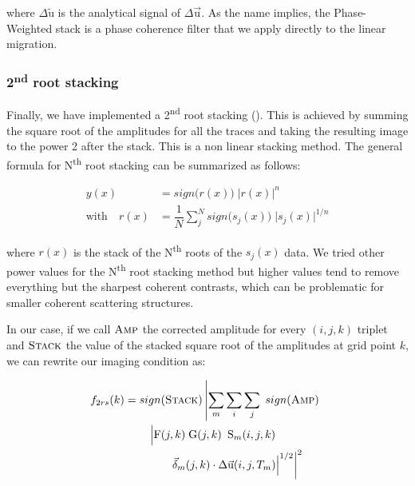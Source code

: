 \documentclass[10pt,a4paper]{article}
\numberwithin{equation}{section}
\DeclareRobustCommand{\rq}[1]{{\sethlcolor{myblue}\hl{#1}}}
\begin{document}
\noindent where $\Delta\tilde{\text{u}}$ is the analytical signal of $\Delta\vec{\text{u}}$.
As the name implies, the Phase-Weighted stack is a phase coherence filter that we apply directly to the linear migration.

\subsubsection{2\textsuperscript{nd} root stacking}

Finally, we have implemented a 2\textsuperscript{nd} root stacking (\cite{schi_gji_97}).
This is achieved by summing the square root of the amplitudes for all the traces and taking the resulting image to the power 2 after the stack.
This is a non linear stacking method.
The general formula for N\textsuperscript{th} root stacking can be summarized as follows:

\begin{align}
  y(x) &= sign\big(r(x)\big) \; \vert r(x) \vert^{n}
  \label{2nd_1}
\\
  \text{with} \quad r(x) &= \dfrac{1}{N} \sum_j^N sign\big(s_j(x)\big) \; \vert s_j(x) \vert^{1/n}
  \label{2nd_2}
\end{align}
\vspace{1mm}

\noindent where $r(x)$ is the stack of the N\textsuperscript{th} roots of the $s_j(x)$ data.
We tried other power values for the N\textsuperscript{th} root stacking method but higher values tend to remove everything but the sharpest coherent contrasts, which can be problematic for smaller coherent scattering structures.

In our case, if we call $\textsc{Amp}$ the corrected amplitude for every $(i,j,k)$ triplet and $\textsc{Stack}$ the value of the stacked square root of the amplitudes at grid point $k$, we can rewrite our imaging condition as:

\begin{align}
  f_{2rs}(k) &= sign(\textsc{Stack}) \left\vert \sum_m \sum_i \sum_j \; sign(\textsc{Amp}) \; \right.\notag\\&\qquad\left. \Big\vert \text{F}(j,k) \; \text{G}(j,k) \tfrac{}{}\; \text{S}_{m}(i,j,k) \; \right.\notag\\&\qquad\qquad\left. \vec{\delta}_{m}(j,k) \cdot \Delta\vec{\text{u}}(i,j,T_m)\Big\vert^{1/2} \right\vert ^2
  \label{2rs}
\end{align}
\vspace{1mm}
\end{document}
